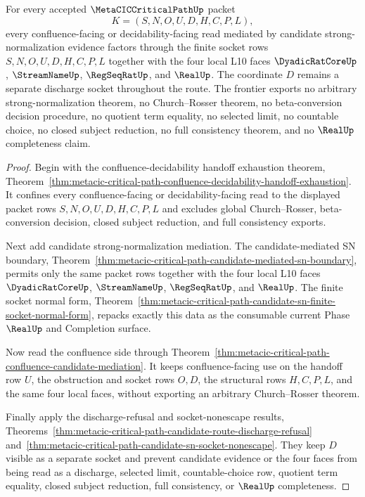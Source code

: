 \begin{theorem}
\label{thm:metacic-critical-path-confluence-decidability-candidate-sn-frontier}
For every accepted $\MetaCICCriticalPathUp$ packet
$$
K=(S,N,O,U,D,H,C,P,L),
$$
every confluence-facing or decidability-facing read mediated by candidate strong-normalization evidence factors through the finite socket rows $S,N,O,U,D,H,C,P,L$ together with the four local L10 faces $\DyadicRatCoreUp$, $\StreamNameUp$, $\RegSeqRatUp$, and $\RealUp$. The coordinate $D$ remains a separate discharge socket throughout the route. The frontier exports no arbitrary strong-normalization theorem, no Church--Rosser theorem, no beta-conversion decision procedure, no quotient term equality, no selected limit, no countable choice, no closed subject reduction, no full consistency theorem, and no $\RealUp$ completeness claim.
\end{theorem}
\begin{proof}
Begin with the confluence-decidability handoff exhaustion theorem, Theorem~\ref{thm:metacic-critical-path-confluence-decidability-handoff-exhaustion}. It confines every confluence-facing or decidability-facing read to the displayed packet rows $S,N,O,U,D,H,C,P,L$ and excludes global Church--Rosser, beta-conversion decision, closed subject reduction, and full consistency exports.

Next add candidate strong-normalization mediation. The candidate-mediated SN boundary, Theorem~\ref{thm:metacic-critical-path-candidate-mediated-sn-boundary}, permits only the same packet rows together with the four local L10 faces $\DyadicRatCoreUp$, $\StreamNameUp$, $\RegSeqRatUp$, and $\RealUp$. The finite socket normal form, Theorem~\ref{thm:metacic-critical-path-candidate-sn-finite-socket-normal-form}, repacks exactly this data as the consumable current Phase $\RealUp$ and Completion surface.

Now read the confluence side through Theorem~\ref{thm:metacic-critical-path-confluence-candidate-mediation}. It keeps confluence-facing use on the handoff row $U$, the obstruction and socket rows $O,D$, the structural rows $H,C,P,L$, and the same four local faces, without exporting an arbitrary Church--Rosser theorem.

Finally apply the discharge-refusal and socket-nonescape results, Theorems~\ref{thm:metacic-critical-path-candidate-route-discharge-refusal} and~\ref{thm:metacic-critical-path-candidate-sn-socket-nonescape}. They keep $D$ visible as a separate socket and prevent candidate evidence or the four faces from being read as a discharge, selected limit, countable-choice row, quotient term equality, closed subject reduction, full consistency, or $\RealUp$ completeness.
\end{proof}

